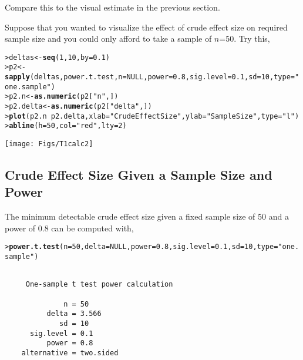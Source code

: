 \documentclass{article}\usepackage{graphicx, color}
\makeatletter
\newcommand{\hlfunctioncall}[1]{\textcolor[rgb]{0.501960784313725,0,0.329411764705882}{\textbf{#1}}}%
\newcommand{\hlstring}[1]{\textcolor[rgb]{0.6,0.6,1}{#1}}%
\newenvironment{kframe}{%
 \def\at@end@of@kframe{}%
 \ifinner\ifhmode%
  \def\at@end@of@kframe{\end{minipage}}%
  \begin{minipage}{\columnwidth}%
 \fi\fi%
 \def\FrameCommand##1{\hskip\@totalleftmargin \hskip-\fboxsep
 \colorbox{shadecolor}{##1}\hskip-\fboxsep
     \hskip-\linewidth \hskip-\@totalleftmargin \hskip\columnwidth}%
 \MakeFramed {\advance\hsize-\width
   \@totalleftmargin\z@ \linewidth\hsize
   \@setminipage}}%
 {\par\unskip\endMakeFramed%
 \at@end@of@kframe}
\newenvironment{knitrout}{}{} %
\makeatother
\begin{document}
Compare this to the visual estimate in the previous section.

Suppose that you wanted to visualize the effect of crude effect size on required sample size and you could only afford to take a sample of $n$=50.  Try this,
\begin{knitrout}
\color{fgcolor}\begin{kframe}
\begin{alltt}
> deltas <- \hlfunctioncall{seq}(1,10,by=0.1)
> p2 <- \hlfunctioncall{sapply}(deltas,power.t.test,n=NULL,power=0.8,sig.level=0.1,sd=10,type=\hlstring{"one.sample"})
> p2.n <- \hlfunctioncall{as.numeric}(p2[\hlstring{"n"},])
> p2.delta <- \hlfunctioncall{as.numeric}(p2[\hlstring{"delta"},])
> \hlfunctioncall{plot}(p2.n~p2.delta,xlab=\hlstring{"Crude Effect Size"},ylab=\hlstring{"Sample Size"},type=\hlstring{"l"})
> \hlfunctioncall{abline}(h=50,col=\hlstring{"red"},lty=2)
\end{alltt}
\end{kframe}

{\centering \texttt{[image: Figs/T1calc2]} 

}



\end{knitrout}


\subsection{Crude Effect Size Given a Sample Size and Power}
The minimum detectable crude effect size given a fixed sample size of 50 and a power of 0.8 can be computed with,
\begin{knitrout}
\color{fgcolor}\begin{kframe}
\begin{alltt}
> \hlfunctioncall{power.t.test}(n=50,delta=NULL,power=0.8,sig.level=0.1,sd=10,type=\hlstring{"one.sample"})
\end{alltt}
\begin{verbatim}

     One-sample t test power calculation 

              n = 50
          delta = 3.566
             sd = 10
      sig.level = 0.1
          power = 0.8
    alternative = two.sided
\end{verbatim}
\end{kframe}
\end{knitrout}
\end{document}
